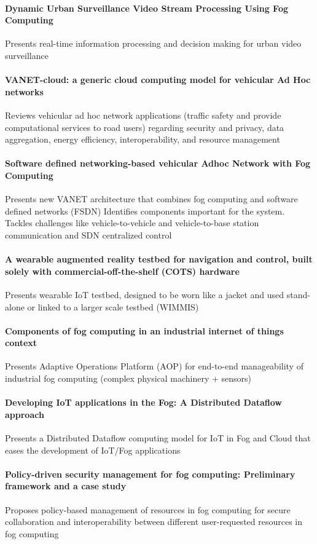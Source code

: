 \paragraph{Dynamic Urban Surveillance Video Stream Processing Using Fog Computing} \cite{chen_dynamic_2016}
Presents real-time information processing and decision making for urban video surveillance

\paragraph{VANET-cloud: a generic cloud computing model for vehicular Ad Hoc networks} \cite{bitam_vanet-cloud:_2015}
Reviews vehicular ad hoc network applications (traffic safety and provide computational services to road users) regarding
security and privacy, data aggregation, energy efficiency, interoperability, and resource management

\paragraph{Software defined networking-based vehicular Adhoc Network with Fog Computing} \cite{truong_software_2015}
Presents new VANET architecture that combines fog computing and software defined networks (FSDN)
Identifies components important for the system. Tackles challenges like vehicle-to-vehicle and vehicle-to-base station communication and SDN centralized control

\paragraph{A wearable augmented reality testbed for navigation and control, built solely with commercial-off-the-shelf (COTS) hardware} \cite{behringer_wearable_2000}
Presents wearable IoT testbed, designed to be worn like a jacket and used stand-alone or linked to a larger scale testbed (WIMMIS)

\paragraph{Components of fog computing in an industrial internet of things context}\cite{gazis_components_2015}
Presents Adaptive Operations Platform (AOP) for end-to-end manageability of industrial fog computing (complex physical machinery + sensors)

\paragraph{Developing IoT applications in the Fog: A Distributed Dataflow approach} \cite{giang_developing_2015}
Presents a Distributed Dataflow computing model for IoT in Fog and Cloud that eases the development of IoT/Fog applications

\paragraph{Policy-driven security management for fog computing: Preliminary framework and a case study} \cite{dsouza_policy-driven_2014}
Proposes policy-based management of resources in fog computing for secure collaboration and interoperabil{}ity between different user-requested resources in fog computing
